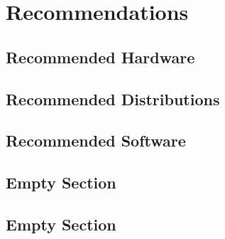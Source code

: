 \chapter{Recommendations}
\localtableofcontents
\clearpage

\section{Recommended Hardware}

\linebreak

\section{Recommended Distributions}

\linebreak

\section{Recommended Software}

\linebreak

\section{Empty Section}

\linebreak

\section{Empty Section}

\linebreak